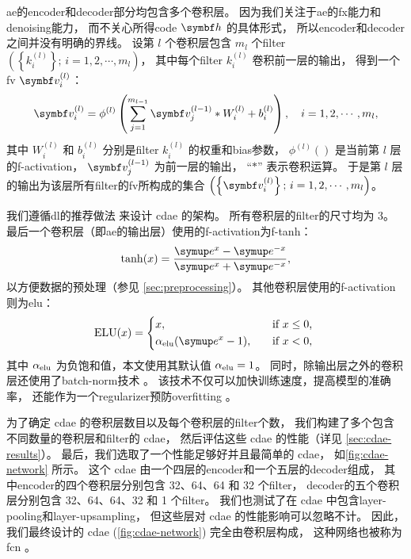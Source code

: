 \ac{ae}的\ac{encoder}和\ac{decoder}部分均包含多个卷积层。
因为我们关注于\ac{ae}的\ac{fx}能力和\ac{denoising}能力，
而不关心所得\ac{code} $\B{h}$ 的具体形式，
所以\ac{encoder}和\ac{decoder}之间并没有明确的界线。
设第 $l$ 个卷积层包含 $m_l$ 个\ac{filter}
$\left(\left\{ k_{i}^{(l)} \right\};\, i = 1, 2, \cdots, m_l \right)$，
其中每个\ac{filter} $k_{i}^{(l)}$ 卷积前一层的输出，
得到一个\ac{fv} $\B{v}_{i}^{(l)}$：
\begin{equation}
  \label{eq:conv}
  \B{v}_{i}^{(l)} = \phi^{(l)} \left( \sum_{j=1}^{m_{l-1}}
    \B{v}_{j}^{(l-1)} * W_i^{(l)} + b_i^{(l)} \right) ,
    \quad i = 1, 2, \cdots, m_{l} ,
\end{equation}
其中
$W_i^{(l)}$ 和 $b_i^{(l)}$ 分别是\ac{filter} $k_{i}^{(l)}$
的权重和\ac{bias}参数，
$\phi^{(l)}()$ 是当前第 $l$ 层的\ac{f-activation}，
$\B{v}_{j}^{(l-1)}$ 为前一层的输出，
\enquote{$*$} 表示卷积运算。
于是第 $l$ 层的输出为该层所有\ac{filter}的\ac{fv}所构成的集合
$\left(\left\{ \B{v}_{i}^{(l)} \right\};\, i = 1, 2, \cdots, m_l \right)$。

我们遵循\ac{dl}的推荐做法\cite{geron2017,suganuma2018} 来设计 \ac{cdae} 的架构。
所有卷积层的\ac{filter}的尺寸均为 3。
最后一个卷积层（即\ac{ae}的输出层）使用的\ac{f-activation}为\ac{f-tanh}：
\begin{equation}
  \tanh(x) = \frac{\Ce^x - \Ce^{-x}}{\Ce^x + \Ce^{-x}} ,
\end{equation}
以方便数据的预处理（参见 \autoref{sec:preprocessing}）。
其他卷积层使用的\ac{f-activation}则为\ac{elu}\cite{clevert2016}：
\begin{equation}
  \text{ELU}(x) =
    \begin{dcases*}
      x , \quad & if $x \le 0$, \\
      \alpha_{\R{elu}} (\Ce^x - 1) , \quad & if $x < 0$,
    \end{dcases*}
\end{equation}
其中 $\alpha_{\mathrm{elu}}$ 为负饱和值，本文使用其默认值 $\alpha_{\mathrm{elu}} = 1$。
同时，除输出层之外的卷积层还使用了\ac{batch-norm}技术 \cite{ioffe2015}。
该技术不仅可以加快训练速度，提高模型的准确率，
还能作为一个\ac{regularizer}预防\ac{overfitting} \cite{geron2017}。

为了确定 \ac{cdae} 的卷积层数目以及每个卷积层的\ac{filter}个数，
我们构建了多个包含不同数量的卷积层和\ac{filter}的 \ac{cdae}，
然后评估这些 \ac{cdae} 的性能（详见 \autoref{sec:cdae-results}）。
最后，我们选取了一个性能足够好并且最简单的 \ac{cdae}，
如\autoref{fig:cdae-network} 所示。
这个 \ac{cdae} 由一个四层的\ac{encoder}和一个五层的\ac{decoder}组成，
其中\ac{encoder}的四个卷积层分别包含 32、64、64 和 32 个\ac{filter}，
\ac{decoder}的五个卷积层分别包含 32、64、64、32 和 1 个\ac{filter}。
我们也测试了在 \ac{cdae} 中包含\ac{layer-pooling}和\ac{layer-upsampling}，
但这些层对 \ac{cdae} 的性能影响可以忽略不计。
因此，我们最终设计的 \ac{cdae} (\autoref{fig:cdae-network}) 完全由卷积层构成，
这种网络也被称为\ac{fcn} \cite{long2015,springenberg2015}。

